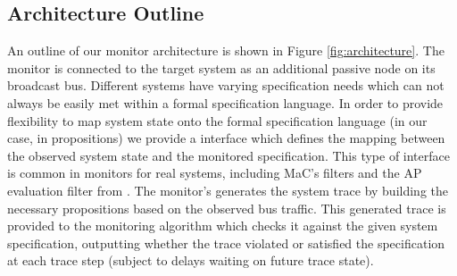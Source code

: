 \subsection{Architecture Outline}
An outline of our monitor architecture is shown in Figure \ref{fig:architecture}. 
The monitor is connected to the target system as an additional passive node on its broadcast bus. 
Different systems have varying specification needs which can not always be easily met within a formal specification language. 
In order to provide flexibility to map system state onto the formal specification language (in our case, in propositions) we provide a \sfmap interface which defines the mapping between the observed system state and the monitored specification. 
This type of interface is common in monitors for real systems, including MaC's filters \cite{Kim2004} and the AP evaluation filter from \cite{Heffernan2014}.
The monitor's \sfmap generates the system trace by building the necessary propositions based on the observed bus traffic. 
This generated trace is provided to the monitoring algorithm which checks it against the given system specification, outputting whether the trace violated or satisfied the specification at each trace step (subject to delays waiting on future trace state).



